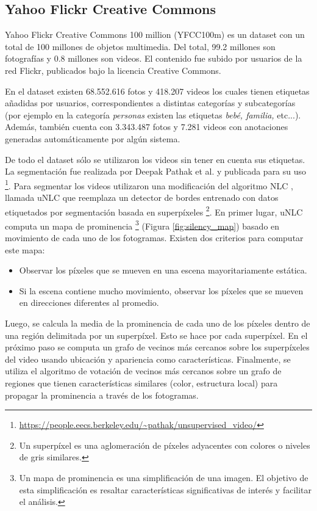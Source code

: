 \documentclass[spanish]{report}
\begin{document}
\subsection{Yahoo Flickr Creative Commons}

Yahoo Flickr Creative Commons 100 million (YFCC100m) \cite{yfcc100m} es un dataset con un total de 100 millones de objetos multimedia. Del total, 99.2 millones son fotografías y 0.8 millones son videos. El contenido fue subido por usuarios de la red Flickr, publicados bajo la licencia Creative Commons.

En el dataset existen 68.552.616 fotos y 418.207 videos los cuales tienen etiquetas añadidas por usuarios, correspondientes a distintas categorías y subcategorías (por ejemplo en la categoría \textit{personas} existen las etiquetas \textit{bebé, familia,} etc...). Además, también cuenta con 3.343.487 fotos y 7.281 videos con anotaciones generadas automáticamente por algún sistema.

De todo el dataset sólo se utilizaron los videos sin tener en cuenta sus etiquetas. La segmentación fue realizada por Deepak Pathak et al. \cite{learning_features} y publicada para su uso \footnote{\url{https://people.eecs.berkeley.edu/~pathak/unsupervised_video/}}. Para segmentar los videos utilizaron una modificación del algoritmo NLC \cite{nlc}, llamada uNLC que reemplaza un detector de bordes entrenado con datos etiquetados por segmentación basada en superpíxeles \footnote{Un superpíxel es una aglomeración de píxeles adyacentes con colores o niveles de gris similares.}.
En primer lugar, uNLC computa un mapa de prominencia \footnote{Un mapa de prominencia es una simplificación de una imagen. El objetivo de esta simplificación es resaltar características significativas de interés y facilitar el análisis.} (Figura \ref{fig:silency_map}) basado en movimiento de cada uno de los fotogramas. Existen dos criterios para computar este mapa:

\begin{itemize}
\item Observar los píxeles que se mueven en una escena mayoritariamente estática. 
\item Si la escena contiene mucho movimiento, observar los píxeles que se mueven en direcciones diferentes al promedio. 
\end{itemize}

\noindent Luego, se calcula la media de la prominencia de cada uno de los píxeles dentro de una región delimitada por un superpíxel. Esto se hace por cada superpíxel. En el próximo paso se computa un grafo de vecinos más cercanos sobre los superpíxeles del video usando ubicación y apariencia como características. Finalmente, se utiliza el algoritmo de votación de vecinos más cercanos sobre un grafo de regiones que tienen características similares (color, estructura local) para propagar la prominencia a través de los fotogramas.
\end{document}

